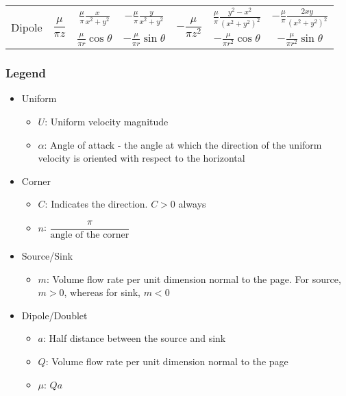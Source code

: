 \documentclass[10pt, letterpaper, notitlepage, landscape]{article}
\begin{document}
\begin{tabular}{|c|c|c|c|c|c|c|}
\hline \multirow{2}{*}{Dipole} %
  & \multirow{2}{*}{$\dfrac{\mu}{\pi z}$} %
    & $\frac{\mu}{\pi} \frac{x}{x^2+y^2}$ %
    & $-\frac{\mu}{\pi} \frac{y}{x^2+y^2}$ %
  & \multirow{2}{*}{$-\dfrac{\mu}{\pi z^2}$} %
    & $\frac{\mu}{\pi} \frac{y^2-x^2}{(x^2+y^2)^2}$ %
    & $-\frac{\mu}{\pi} \frac{2xy}{(x^2+y^2)^2}$ %
  \\ \cline{3-4} \cline{6-7} 
  & 
    & $\frac{\mu}{\pi r} \cos{\theta}$ %
    & $-\frac{\mu}{\pi r} \sin{\theta}$ %
  & 
    & $-\frac{\mu}{\pi r^2} \cos{\theta}$ %
    & $-\frac{\mu}{\pi r^2} \sin{\theta}$ %
\\


\hline
\end{tabular}

\subsubsection{Legend}
\begin{itemize}
  \item Uniform
  \begin{itemize}
    \item $U$: Uniform velocity magnitude
    \item $\alpha$: Angle of attack - the angle at which the direction of the uniform velocity is oriented with respect to the horizontal
  \end{itemize}
  \item Corner
  \begin{itemize}
    \item $C$: Indicates the direction. $C > 0$ always
    \item $n$: $\dfrac{\pi}{\text{angle of the corner}}$
  \end{itemize} 
  \item Source/Sink
  \begin{itemize}
    \item $m$: Volume flow rate per unit dimension normal to the page. For source, $m > 0$, whereas for sink, $m < 0$
  \end{itemize}
  \item Dipole/Doublet
  \begin{itemize}
    \item $a$: Half distance between the source and sink
    \item $Q$: Volume flow rate per unit dimension normal to the page
    \item $\mu$: $Q a$
  \end{itemize}        
\end{itemize}
\end{document}
